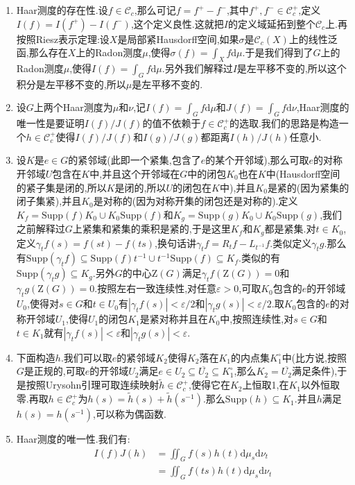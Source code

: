 \begin{enumerate}
\begin{proof}
    	最后左平移不变是因为$I_{\varphi}(f)=I_{\varphi}(L_gf)$,依旧按照上一条做放缩得到结论.
    \end{proof}
    \item Haar测度的存在性.设$f\in\mathscr{C}_c$,那么可记$f=f^+-f^-$,其中$f^+,f^-\in\mathscr{C}_c^+$,定义$I(f)=I(f^+)-I(f^-)$,这个定义良性.这就把$I$的定义域延拓到整个$\mathscr{C}_c$上.再按照Riesz表示定理:设$X$是局部紧Hausdorff空间,如果$\sigma$是$\mathscr{C}_c(X)$上的线性泛函,那么存在$X$上的Radon测度$\mu$,使得$\sigma(f)=\int_Xf\mathrm{d}\mu$.于是我们得到了$G$上的Radon测度$\mu$,使得$I(f)=\int_Gf\mathrm{d}\mu$.另外我们解释过$I$是左平移不变的,所以这个积分是左平移不变的,所以$\mu$是左平移不变的.
    \item 设$G$上两个Haar测度为$\mu$和$\nu$,记$I(f)=\int_Gf\mathrm{d}\mu$和$J(f)=\int_Gf\mathrm{d}\nu$,Haar测度的唯一性是要证明$I(f)/J(f)$的值不依赖于$f\in\mathscr{C}_c^+$的选取.我们的思路是构造一个$h\in\mathscr{C}_c^+$使得$I(f)/J(f)$和$I(g)/J(g)$都距离$I(h)/J(h)$任意小.
    \item 设$K$是$e\in G$的紧邻域(此即一个紧集,包含了$e$的某个开邻域),那么可取$e$的对称开邻域$U$包含在$K$中,并且这个开邻域在$G$中的闭包$K_0$也在$K$中(Hausdorff空间的紧子集是闭的,所以$K$是闭的,所以$U$的闭包在$K$中),并且$K_0$是紧的(因为紧集的闭子集紧),并且$K_0$是对称的(因为对称开集的闭包还是对称的).定义$K_f=\mathrm{Supp}(f)K_0\cup K_0\mathrm{Supp}(f)$和$K_g=\mathrm{Supp}(g)K_0\cup K_0\mathrm{Supp}(g)$,我们之前解释过$G$上紧集和紧集的乘积是紧的,于是这里$K_f$和$K_g$都是紧集.对$t\in K_0$,定义$\gamma_tf(s)=f(st)-f(ts)$,换句话讲$\gamma_tf=R_tf-L_{t^{-1}}f$.类似定义$\gamma_tg$.那么有$\mathrm{Supp}(\gamma_tf)\subseteq\mathrm{Supp}(f)t^{-1}\cup t^{-1}\mathrm{Supp}(f)\subseteq K_f$.类似的有$\mathrm{Supp}(\gamma_tg)\subseteq K_g$.另外$G$的中心$\mathrm{Z}(G)$满足$\gamma_tf(\mathrm{Z}(G))=0$和$\gamma_tg(\mathrm{Z}(G))=0$.按照左右一致连续性,对任意$\varepsilon>0$,可取$K_0$包含的$e$的开邻域$U_0$,使得对$s\in G$和$t\in U_0$有$|\gamma_tf(s)|<\varepsilon/2$和$|\gamma_tg(s)|<\varepsilon/2$.取$K_0$包含的$e$的对称开邻域$U_1$,使得$U_1$的闭包$K_1$是紧对称并且在$K_0$中,按照连续性,对$s\in G$和$t\in K_1$就有$|\gamma_tf(s)|<\varepsilon$和$|\gamma_tg(s)|<\varepsilon$.
    \item 下面构造$h$.我们可以取$e$的紧邻域$K_2$使得$K_2$落在$K_1$的内点集$K_1^{\circ}$中(比方说,按照$G$是正规的,可取$e$的开邻域$U_2$满足$e\in U_2\subseteq\overline{U_2}\subseteq K_1^{\circ}$,那么$K_2=\overline{U_2}$满足条件),于是按照Urysohn引理可取连续映射$\widetilde{h}\in\mathscr{C}_c^+$,使得它在$K_2$上恒取1,在$K_1$以外恒取零.再取$h\in\mathscr{C}_c^+$为$h(s)=\widetilde{h}(s)+\widetilde{h}(s^{-1})$.那么$\mathrm{Supp}(h)\subseteq K_1$.并且$h$满足$h(s)=h(s^{-1})$,可以称为偶函数.
    \item Haar测度的唯一性.我们有:
    \begin{align*}
    	I(f)J(h)&=\iint_Gf(s)h(t)\mathrm{d}\mu_s\mathrm{d}\nu_t\\&=\iint_Gf(ts)h(t)\mathrm{d}\mu_s\mathrm{d}\nu_t
    \end{align*}
    

\end{enumerate}
